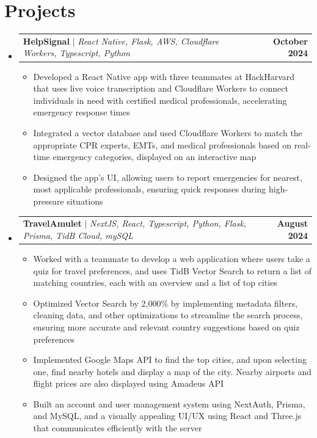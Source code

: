 \documentclass[letterpaper,11pt]{article}
\makeatletter
\newcommand{\resumeItem}[1]{
  \item\small{
    {#1 \vspace{-2pt}}
  }
}
\newcommand{\resumeProjectHeading}[2]{
    \item
    \begin{tabular*}{1.001\textwidth}{l@{\extracolsep{\fill}}r}
      \small#1 & \textbf{\small #2}\\
    \end{tabular*}\vspace{-7pt}
}
\newcommand{\resumeSubHeadingListStart}{\begin{itemize}[leftmargin=0.0in, label={}]}
\newcommand{\resumeSubHeadingListEnd}{\end{itemize}}
\newcommand{\resumeItemListStart}{\begin{itemize}}
\newcommand{\resumeItemListEnd}{\end{itemize}\vspace{-5pt}}
\makeatother
\begin{document}
\vspace{-17pt}
\section{Projects}
  \vspace{-7pt}
    \resumeSubHeadingListStart
      \resumeProjectHeading
          {\textbf{HelpSignal} $|$ \emph{React Native, Flask, AWS, Cloudflare Workers, Typescript, Python}}{October 2024}
          \resumeItemListStart
            \resumeItem{Developed a React Native app with three teammates at HackHarvard that uses live voice transcription and Cloudflare Workers to connect individuals in need with certified medical professionals, accelerating emergency response times}
            \resumeItem{Integrated a vector database and used Cloudflare Workers to match the appropriate CPR experts, EMTs, and medical professionals based on real-time emergency categories, displayed on an interactive map}
            \resumeItem{Designed the app's UI, allowing users to report emergencies for nearest, most applicable professionals, ensuring quick responses during high-pressure situations}
        \resumeItemListEnd
      \vspace{-20pt} %
      \resumeProjectHeading
          {\textbf{TravelAmulet} $|$ \emph{NextJS, React, Typescript, Python, Flask, Prisma, TidB Cloud, mySQL}}{August 2024}
          \resumeItemListStart
            \resumeItem{Worked with a teammate to develop a web application where users take a quiz for travel preferences, and uses TidB Vector Search to return a list of matching countries, each with an overview and a list of top cities}
            \resumeItem{Optimized Vector Search by 2,000\% by implementing metadata filters, cleaning data, and other optimizations to streamline the search process, ensuring more accurate and relevant country suggestions based on quiz preferences}
            \resumeItem{Implemented Google Maps API to find the top cities, and upon selecting one, find nearby hotels and display a map of the city. Nearby airports and flight prices are also displayed using Amadeus API}
            \resumeItem{Built an account and user management system using NextAuth, Prisma, and MySQL, and a visually appealing UI/UX using React and Three.js that communicates efficiently with the server}
          \resumeItemListEnd
    \resumeSubHeadingListEnd
\end{document}
